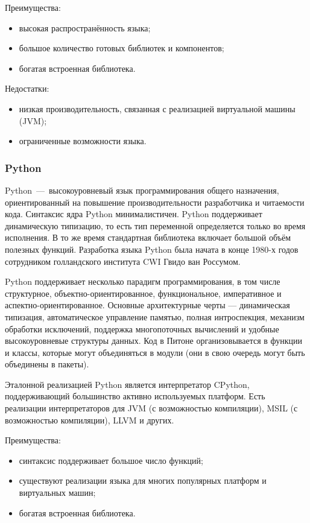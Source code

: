Преимущества:
\begin{itemize}
	\item высокая распространённость языка;
	\item большое количество готовых библиотек и компонентов;
	\item богатая встроенная библиотека.
\end{itemize}

Недостатки:
\begin{itemize}
	\item низкая производительность, связанная с реализацией виртуальной машины (JVM);
	\item ограниченные возможности языка.~\cite{WikiJava}
\end{itemize}

\subsubsection{Python}
Python~---~высокоуровневый язык программирования общего назначения, ориентированный на повышение производительности разработчика и читаемости кода. Синтаксис ядра Python минималистичен. Python поддерживает динамическую типизацию, то есть тип переменной определяется только во время исполнения. В то же время стандартная библиотека включает большой объём полезных функций. Разработка языка Python была начата в конце 1980-х годов сотрудником голландского института CWI Гвидо ван Россумом.

Python поддерживает несколько парадигм программирования, в том числе структурное, объектно-ориентированное, функциональное, императивное и аспектно-ориентированное. Основные архитектурные черты — динамическая типизация, автоматическое управление памятью, полная интроспекция, механизм обработки исключений, поддержка многопоточных вычислений и удобные высокоуровневые структуры данных. Код в Питоне организовывается в функции и классы, которые могут объединяться в модули (они в свою очередь могут быть объединены в пакеты).

Эталонной реализацией Python является интерпретатор CPython, поддерживающий большинство активно используемых платформ. Есть реализации интерпретаторов для JVM (с возможностью компиляции), MSIL (с возможностью компиляции), LLVM и других.

Преимущества:
\begin{itemize}
	\item синтаксис поддерживает большое число функций;
	\item существуют реализации языка для многих популярных платформ и виртуальных машин;
	\item богатая встроенная библиотека.
\end{itemize}

